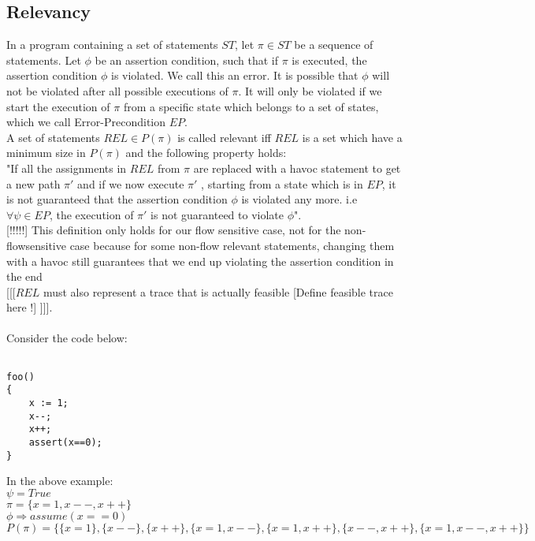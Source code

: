 \documentclass{article}
\begin{document}
\subsection{Relevancy}
In a program containing a set of statements $ST$, let $\pi \in ST$ be a sequence of statements. Let $\phi$ be an assertion condition, such that if $\pi$ is executed, the assertion condition $\phi$ is violated. We call this an error. It is possible that $\phi$ will not be violated after all possible executions of $\pi$. It will only be violated if we start the execution of $\pi$ from a specific state which belongs to a set of states, which we call Error-Precondition $EP$.\\
A set of statements $REL \in {P}(\pi)$ is called relevant iff $REL$ is a set which have a minimum size in ${P}(\pi)$ and the following property holds:
\\ "If all the assignments in $REL$ from $\pi$ are replaced with a havoc statement to get a new path $\pi'$ and if we now execute $\pi'$ , starting from a state which is in $EP$, it is not guaranteed that the assertion condition $\phi$ is violated any more. i.e $ \forall  \psi \in EP$, the execution of  $\pi'$  is not guaranteed to violate $\phi$". 
\\
{\tiny [!!!!!] This definition only holds for our flow sensitive case, not for the non-flowsensitive case because for some non-flow relevant statements, changing them with a havoc still guarantees that we end up violating the assertion condition in the end}
\\
{\tiny [[[$REL$ must also represent a trace that is actually feasible [Define feasible trace here !] ]]].}
\\
\\
Consider the code below:
\begin{lstlisting}

foo()
{
	x := 1;
	x--;
	x++;
	assert(x==0);
}

\end{lstlisting}
In the above example:\\
$\psi = True$            \\
$\pi = \{ x=1, x--, x++\} $\\    
$\phi \Rightarrow assume(x==0) $   
$${P}(\pi) =\{\{x=1\}, \{x--\},\{x++\}, \{x=1,x--\},\{x=1,x++\},\{x--,x++\},\{x=1,x--,x++\}\}$$
\end{document}
